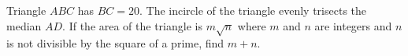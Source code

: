 Triangle  $ABC$ has $BC=20$. The incircle of the triangle evenly trisects the median $AD$. If the area of the triangle is $m \sqrt{n}$ where $m$ and $n$ are integers and $n$ is not divisible by the square of a prime, find $m+n$.